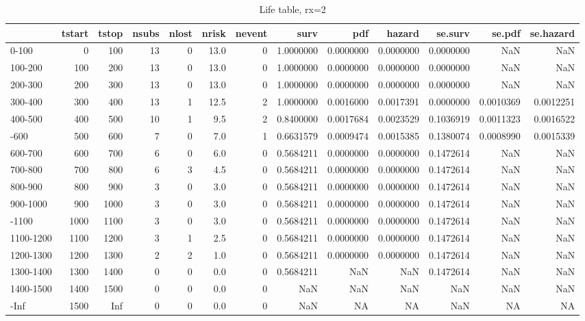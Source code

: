 \documentclass[
]{article}
\begin{document}
\begin{table}[H]

\caption{\label{tab:life_table_rx2}Life table, rx=2}
\centering
\fontsize{7}{9}\selectfont
\begin{tabular}[t]{lrrrrrrrrrrrr}
\toprule
  & tstart & tstop & nsubs & nlost & nrisk & nevent & surv & pdf & hazard & se.surv & se.pdf & se.hazard\\
\midrule
0-100 & 0 & 100 & 13 & 0 & 13.0 & 0 & 1.0000000 & 0.0000000 & 0.0000000 & 0.0000000 & NaN & NaN\\
100-200 & 100 & 200 & 13 & 0 & 13.0 & 0 & 1.0000000 & 0.0000000 & 0.0000000 & 0.0000000 & NaN & NaN\\
200-300 & 200 & 300 & 13 & 0 & 13.0 & 0 & 1.0000000 & 0.0000000 & 0.0000000 & 0.0000000 & NaN & NaN\\
300-400 & 300 & 400 & 13 & 1 & 12.5 & 2 & 1.0000000 & 0.0016000 & 0.0017391 & 0.0000000 & 0.0010369 & 0.0012251\\
400-500 & 400 & 500 & 10 & 1 & 9.5 & 2 & 0.8400000 & 0.0017684 & 0.0023529 & 0.1036919 & 0.0011323 & 0.0016522\\
\addlinespace
500-600 & 500 & 600 & 7 & 0 & 7.0 & 1 & 0.6631579 & 0.0009474 & 0.0015385 & 0.1380074 & 0.0008990 & 0.0015339\\
600-700 & 600 & 700 & 6 & 0 & 6.0 & 0 & 0.5684211 & 0.0000000 & 0.0000000 & 0.1472614 & NaN & NaN\\
700-800 & 700 & 800 & 6 & 3 & 4.5 & 0 & 0.5684211 & 0.0000000 & 0.0000000 & 0.1472614 & NaN & NaN\\
800-900 & 800 & 900 & 3 & 0 & 3.0 & 0 & 0.5684211 & 0.0000000 & 0.0000000 & 0.1472614 & NaN & NaN\\
900-1000 & 900 & 1000 & 3 & 0 & 3.0 & 0 & 0.5684211 & 0.0000000 & 0.0000000 & 0.1472614 & NaN & NaN\\
\addlinespace
1000-1100 & 1000 & 1100 & 3 & 0 & 3.0 & 0 & 0.5684211 & 0.0000000 & 0.0000000 & 0.1472614 & NaN & NaN\\
1100-1200 & 1100 & 1200 & 3 & 1 & 2.5 & 0 & 0.5684211 & 0.0000000 & 0.0000000 & 0.1472614 & NaN & NaN\\
1200-1300 & 1200 & 1300 & 2 & 2 & 1.0 & 0 & 0.5684211 & 0.0000000 & 0.0000000 & 0.1472614 & NaN & NaN\\
1300-1400 & 1300 & 1400 & 0 & 0 & 0.0 & 0 & 0.5684211 & NaN & NaN & 0.1472614 & NaN & NaN\\
1400-1500 & 1400 & 1500 & 0 & 0 & 0.0 & 0 & NaN & NaN & NaN & NaN & NaN & NaN\\
\addlinespace
1500-Inf & 1500 & Inf & 0 & 0 & 0.0 & 0 & NaN & NA & NA & NaN & NA & NA\\
\bottomrule
\end{tabular}
\end{table}
\end{document}
